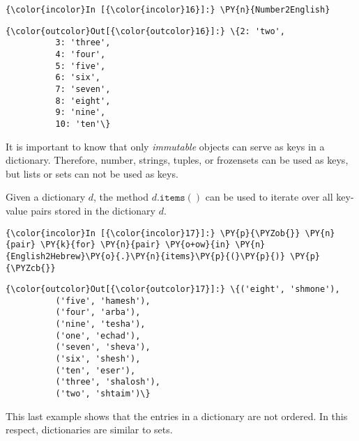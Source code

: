 \begin{Verbatim}[commandchars=\\\{\}]
{\color{incolor}In [{\color{incolor}16}]:} \PY{n}{Number2English}
\end{Verbatim}

\begin{Verbatim}[commandchars=\\\{\}]
{\color{outcolor}Out[{\color{outcolor}16}]:} \{2: 'two',
          3: 'three',
          4: 'four',
          5: 'five',
          6: 'six',
          7: 'seven',
          8: 'eight',
          9: 'nine',
          10: 'ten'\}
\end{Verbatim}      
It is important to know that only \emph{immutable} objects can serve as keys in
a dictionary. Therefore, number, strings, tuples, or frozensets can be
used as keys, but lists or sets can not be used as keys.

Given a dictionary \(d\), the method \(d.\texttt{items}()\) can be used
to iterate over all key-value pairs stored in the dictionary \(d\).
\begin{Verbatim}[commandchars=\\\{\}]
{\color{incolor}In [{\color{incolor}17}]:} \PY{p}{\PYZob{}} \PY{n}{pair} \PY{k}{for} \PY{n}{pair} \PY{o+ow}{in} \PY{n}{English2Hebrew}\PY{o}{.}\PY{n}{items}\PY{p}{(}\PY{p}{)} \PY{p}{\PYZcb{}}
\end{Verbatim}


\begin{Verbatim}[commandchars=\\\{\}]
{\color{outcolor}Out[{\color{outcolor}17}]:} \{('eight', 'shmone'),
          ('five', 'hamesh'),
          ('four', 'arba'),
          ('nine', 'tesha'),
          ('one', 'echad'),
          ('seven', 'sheva'),
          ('six', 'shesh'),
          ('ten', 'eser'),
          ('three', 'shalosh'),
          ('two', 'shtaim')\}
\end{Verbatim}
This last example shows that the entries in a dictionary are not ordered.  In this respect, dictionaries are
similar to sets.


